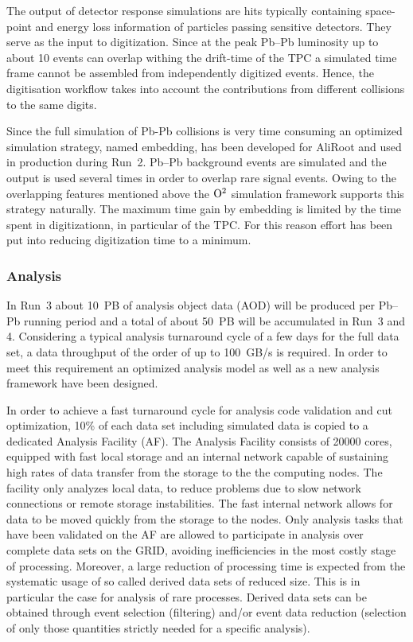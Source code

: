 The output of detector response simulations are hits typically containing space-point
and energy loss information of particles passing sensitive detectors. They serve as the
input to digitization. Since at the peak Pb--Pb luminosity up to about 10 events can
overlap withing the drift-time of the TPC a simulated time frame cannot be assembled
from independently digitized events. Hence, the digitisation workflow takes into
account the contributions from different collisions to the same digits.

Since the full simulation of Pb-Pb collisions is very time consuming an optimized
simulation strategy, named embedding, has been developed for AliRoot and used in
production during Run~2. Pb--Pb background events are simulated and the output is
used several times in order to overlap rare signal events. Owing to the overlapping features
mentioned above the ${\rm O}^2$ simulation framework supports this strategy naturally. The maximum time gain by embedding is limited by the time spent in digitizationn, in particular of the TPC.
For this reason effort has been put into reducing digitization time to a minimum.

\subsubsection{Analysis}
In Run~3 about 10~PB of analysis object data (AOD) will be produced per Pb--Pb running period and
a total of about 50~PB will be accumulated in Run~3 and 4. Considering a typical analysis
turnaround cycle of a few days for the full data set, a data throughput of the order of up to
100~GB/s is required. In order to meet this requirement an optimized analysis model as well as a
new analysis framework have been designed.

In order to achieve a fast turnaround cycle for analysis code validation and cut
optimization, 10\% of each data set including simulated data is copied to a
dedicated Analysis Facility (AF). The Analysis Facility consists of 20000 cores,
equipped with fast local storage and an internal network capable of sustaining
high rates of data transfer from the storage to the the computing nodes. The
facility only analyzes local data, to reduce problems due to slow network
connections or remote storage instabilities. The fast internal network allows for
data to be moved quickly from the storage to the nodes. Only analysis tasks that
have been validated on the AF are allowed to participate in analysis over complete data
sets on the GRID, avoiding inefficiencies in the most costly stage of processing.
Moreover, a large reduction of processing time is expected from the systematic
usage of so called derived data sets of reduced size. This is in particular the
case for analysis of rare processes.
Derived data sets can be obtained through event selection (filtering) and/or event
data reduction (selection of only those quantities strictly needed for a specific analysis).

